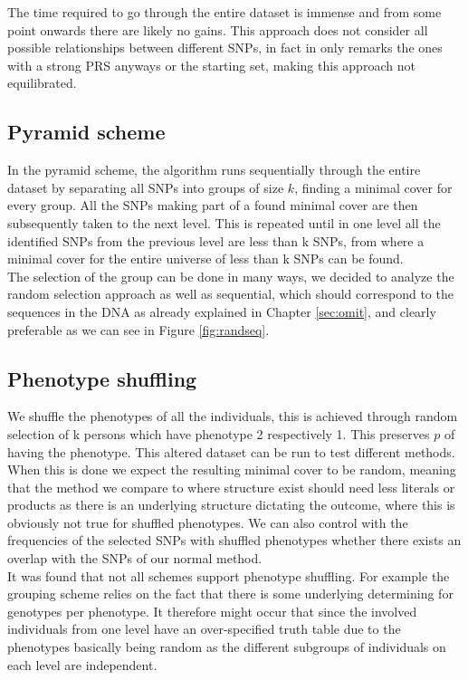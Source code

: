 \documentclass[letterpaper, 11pt]{article}
\begin{document}
The time required to go through the entire dataset is immense and from some point onwards there are likely no gains. This approach does not consider all possible relationships between different SNPs, in fact in only remarks the ones with a strong PRS anyways or the starting set, making this approach not equilibrated. 



\subsection{Pyramid scheme}
In the pyramid scheme, the algorithm runs sequentially  through the entire dataset by separating all SNPs into groups of size $k$, finding a minimal cover for every group. All the SNPs making part of a found minimal cover are then subsequently taken to the next level. This is repeated until in one level  all the identified SNPs from the previous level are less than k SNPs, from where a minimal cover for the entire universe of less than k SNPs can be found. \\

The selection of the group can be done in many ways, we decided to analyze the random selection approach as well as sequential, which should correspond to the sequences in the DNA as already explained in Chapter \ref{sec:omit}, and clearly preferable as we can see in Figure \ref{fig:randseq}.


\subsection{Phenotype shuffling}
We shuffle the phenotypes of all the individuals, this is achieved through random selection of k persons which have phenotype 2 respectively 1. This preserves $p$ of having the phenotype. 
This altered dataset can be run to test different methods. When this is done we expect the resulting minimal cover to be random, meaning that the method we compare to where structure exist should need less literals or products as there is an underlying structure dictating the outcome, where this is obviously not true for shuffled phenotypes. We can also control with the frequencies of the selected SNPs with shuffled phenotypes whether there exists an overlap with the SNPs of our normal method. \\
It was found that not all schemes support phenotype shuffling. For example the grouping scheme relies on the fact that there is some underlying determining for genotypes per phenotype. It therefore might occur that since the involved individuals from one level have an over-specified truth table due to the phenotypes basically being random as the different subgroups of individuals on each level are independent.  \\
\end{document}
